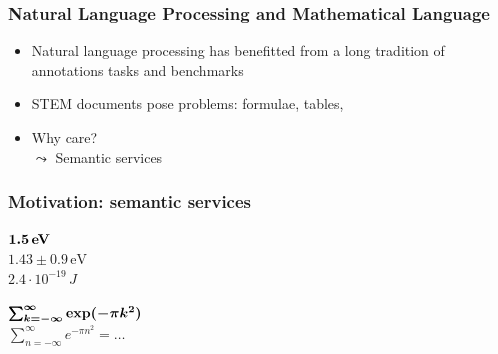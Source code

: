 
\begin{frame}
    \frametitle{Natural Language Processing and Mathematical Language}
    \begin{itemize}
        \item Natural language processing has benefitted from a long tradition of annotations tasks and benchmarks
        \item STEM documents pose problems:
            formulae, tables, \textellipsis
        \item Why care?\\
            $\leadsto$ Semantic services
    \end{itemize}
\end{frame}


\begin{frame}
    \frametitle{Motivation: semantic services}
    \faSearch\;\; $\bm{1.5\,\text{\bf eV}}$
    \\[1em]
        \quad\quad\faExternalLink\;\; $1.43 \pm 0.9\,\text{eV}$\\[1em]
        \quad\quad\faExternalLink\;\; $2.4 \cdot 10^{-19}\,J$

    \vspace{3em}
    \faSearch\;\; $\bm{\sum_{k=-\infty}^\infty \text{\bf exp}(-\pi k^2)}$
    \\[1em]
        \quad\quad\faExternalLink\;\; $\sum_{n=-\infty}^\infty e^{-\pi n^2} = \ldots$
\end{frame}


